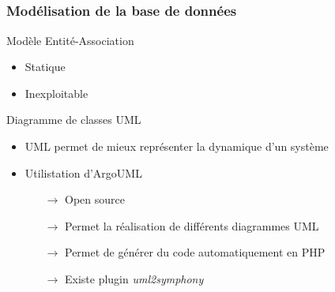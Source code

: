 \subsection{} 

\begin{frame}
\frametitle{Modélisation de la base de données}
		Modèle Entité-Association
		\begin{itemize}
			\item Statique
			\item Inexploitable \\
		\end{itemize}		 
		 Diagramme de classes UML
		\begin{itemize}
			\item UML permet de mieux représenter la dynamique d'un système
			\item Utilistation d'ArgoUML
			\begin{itemize}
				\item[$\rightarrow  $] Open source
				\item[$\rightarrow  $] Permet la réalisation de différents diagrammes UML
				\item[$\rightarrow  $] Permet de générer du code automatiquement en PHP
				\item[$\rightarrow  $] Existe plugin \textit{uml2symphony}
			\end{itemize}
		\end{itemize}
\end{frame}


